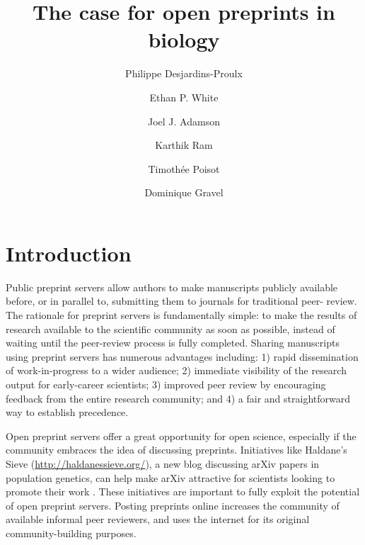 \documentclass[letterpaper]{article}
\begin{document}
\title{The case for open preprints in biology}

\author[1,2,3]{Philippe Desjardins-Proulx}
\author[4]{Ethan P. White}
\author[5]{Joel J. Adamson}
\author[6]{Karthik Ram}
\author[2,3,7]{Timoth\'ee Poisot}
\author[2,3]{Dominique Gravel}

\maketitle

\section{Introduction}

Public preprint servers allow authors to make manuscripts publicly available
before, or in parallel to, submitting them to journals for traditional peer-
review. The rationale for preprint servers is fundamentally simple: to make
the results of research available to the scientific community as
soon as possible, instead of waiting until the peer-review process is fully
completed.  Sharing manuscripts using preprint servers has numerous advantages
including: 1) rapid dissemination of work-in-progress to a wider audience; 2)
immediate visibility of the research output for early-career scientists; 3)
improved peer review by encouraging feedback from the entire research
community; and 4) a fair and straightforward way to establish precedence.

Open preprint servers offer a great opportunity for open science, especially if
the community embraces the idea of discussing preprints. Initiatives like
Haldane's Sieve (\href{http://haldanessieve.org/}{http://haldanessieve.org/}), a
new blog discussing arXiv papers in population genetics, can help make arXiv
attractive for scientists looking to promote their work \cite{lom12}. These
initiatives are important to fully exploit the potential of open preprint
servers. Posting preprints online increases the community of available informal
peer reviewers, and uses the internet for its original community-building
purposes.
\end{document}
